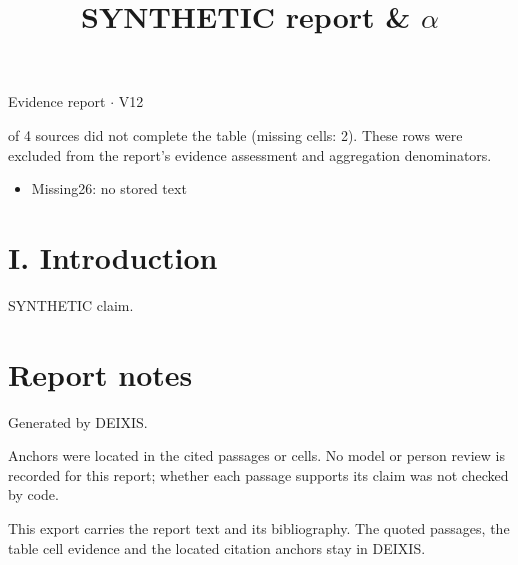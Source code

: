 \documentclass[journal]{IEEEtran}
\begin{document}
\title{SYNTHETIC report \& \ensuremath{\alpha}}

\maketitle

\noindent Evidence report \ensuremath{\cdot} V12

 of 4 sources did not complete the table (missing cells: 2). These rows were excluded from the report's evidence assessment and aggregation denominators.

\begin{itemize}
\item Missing26: no stored text
\end{itemize}

\section*{I. Introduction}

SYNTHETIC claim. \cite{Synth26}

\section*{Report notes}

Generated by DEIXIS.

Anchors were located in the cited passages or cells. No model or person review is recorded for this report; whether each passage supports its claim was not checked by code.

This export carries the report text and its bibliography. The quoted passages, the table cell evidence and the located citation anchors stay in DEIXIS.




\end{document}
